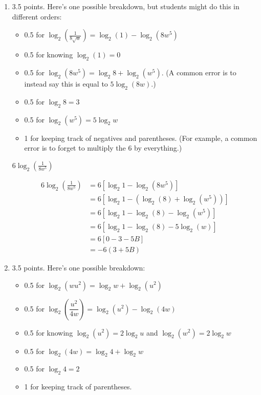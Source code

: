 \documentclass{article}
\begin{document}
\begin{enumerate}
\begin{enumerate}
  \item

    \begin{grading}
      3.5 points. Here's one possible breakdown, but students might do this in different orders:
      \begin{itemize}[nosep]
      \item 0.5 for $\displaystyle \log_2\left(\frac{1}{8 \sqrt{w}}\right) = \log_2(1) - \log_2 (8 w^5)$
      \item 0.5 for knowing $\log_2(1) = 0$
      \item 0.5 for $\log_2 (8 w^5) = \log_2 8 + \log_2 (w^5)$. (A common error is to instead say this is equal to $5 \log_2 (8w)$.) 
      \item 0.5 for $\log_2 8 = 3$
      \item 0.5 for $\log_2 (w^5) = 5 \log_2 w$
      \item 1 for keeping track of negatives and parentheses. (For example, a common error is to forget to multiply the 6 by everything.) 
      \end{itemize}
    \end{grading}

    \begin{problem}[\vfill]
      $\displaystyle 6 \log_2\left(\frac{1}{8 w^5}\right)$
    \end{problem}

    \begin{solution}
      \begin{align*}
        6 \log_2\left(\frac{1}{8 w^5}\right) 
        &= 6\left[\log_2 1 - \log_2(8w^5)\right] \\
        &= 6\left[\log_2 1 - (\log_2(8) + \log_2(w^5))\right] \\
        &= 6\left[\log_2 1 - \log_2(8) - \log_2(w^5)\right] \\
        &= 6\left[\log_2 1 - \log_2(8) - 5\log_2(w)\right] \\
        &= 6\left[0 - 3 - 5B\right] \\
        &= \boxed{-6(3+5B)}
      \end{align*}
    \end{solution}

  \item

    \begin{grading}
      3.5 points. Here's one possible breakdown:
      \begin{itemize}[nosep]
      \item 0.5 for $\log_2(wu^2) = \log_2 w + \log_2(u^2)$
      \item 0.5 for $\log_2 \left( \dfrac{u^2}{4w} \right) = \log_2(u^2) - \log_2(4w)$
      \item 0.5 for knowing $\log_2(u^2) = 2 \log_2 u$ and $\log_2(w^2) = 2 \log_2 w$
      \item 0.5 for $\log_2(4w) = \log_2 4 + \log_2 w$
      \item 0.5 for $\log_2 4 = 2$
      \item 1 for keeping track of parentheses. 
      \end{itemize}
    \end{grading}


\end{enumerate}
\end{enumerate}
\end{document}
